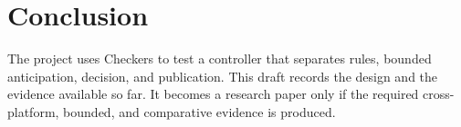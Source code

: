\documentclass[11pt]{article}
\begin{document}
\section{Conclusion}

The project uses Checkers to test a controller that separates rules,
bounded anticipation, decision, and publication. This draft records the
design and the evidence available so far. It becomes a research paper only if
the required cross-platform, bounded, and comparative evidence is produced.



\end{document}
